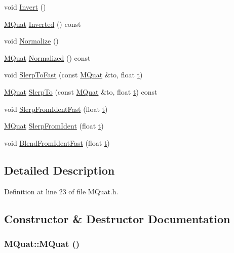 \begin{CompactItemize}
\item 
void \hyperlink{class_m_quat_fee8bfad4412a9f64fc3a493dcfc1152}{Invert} ()
\item 
\hyperlink{class_m_quat}{MQuat} \hyperlink{class_m_quat_e06b631563df1502b73008829e33f278}{Inverted} () const 
\item 
void \hyperlink{class_m_quat_cba836d9852fe104543d68f9dab2aaaf}{Normalize} ()
\item 
\hyperlink{class_m_quat}{MQuat} \hyperlink{class_m_quat_78397c335aeb118bf6f928c063f6431a}{Normalized} () const 
\item 
void \hyperlink{class_m_quat_34b3340801674c4f167e4301fd1e9d5a}{SlerpToFast} (const \hyperlink{class_m_quat}{MQuat} \&to, float \hyperlink{glext__bak_8h_00140d6f5c548b26daf170bf16e86a6d}{t})
\item 
\hyperlink{class_m_quat}{MQuat} \hyperlink{class_m_quat_e8ffbbff43cc352a258cf65a0f21e6da}{SlerpTo} (const \hyperlink{class_m_quat}{MQuat} \&to, float \hyperlink{glext__bak_8h_00140d6f5c548b26daf170bf16e86a6d}{t}) const 
\item 
void \hyperlink{class_m_quat_11cd2854533b239018aba53fa458cad2}{SlerpFromIdentFast} (float \hyperlink{glext__bak_8h_00140d6f5c548b26daf170bf16e86a6d}{t})
\item 
\hyperlink{class_m_quat}{MQuat} \hyperlink{class_m_quat_14142a1d596dd9adbd9fba59b94123d4}{SlerpFromIdent} (float \hyperlink{glext__bak_8h_00140d6f5c548b26daf170bf16e86a6d}{t})
\item 
void \hyperlink{class_m_quat_8fda2e1badcf8a38c475b14c7c3cf87b}{BlendFromIdentFast} (float \hyperlink{glext__bak_8h_00140d6f5c548b26daf170bf16e86a6d}{t})
\end{CompactItemize}


\subsection{Detailed Description}


Definition at line 23 of file MQuat.h.

\subsection{Constructor \& Destructor Documentation}
\hypertarget{class_m_quat_9fd65558912003344340a92e641a3988}{
\subsubsection[{MQuat}]{\setlength{\rightskip}{0pt plus 5cm}MQuat::MQuat ()}}
\label{class_m_quat_9fd65558912003344340a92e641a3988}




